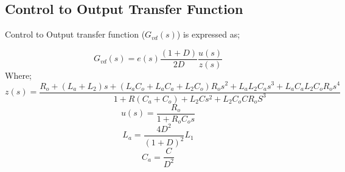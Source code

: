 \documentclass[12pt]{article}
\begin{document}
\begin{figure}[h]
    \qquad
\end{figure}

\pagebreak

\subsection{Control to Output Transfer Function}
Control to Output transfer function ($G_{vd}(s)$) is expressed as;

$$G_{vd}(s) = e(s)\frac{(1+D)}{2D}\frac{u(s)}{z(s)}$$
Where;
$$z(s) = \frac{R_o + (L_a + L_2)s + (L_a C_o + L_a C_a + L_2 C_o)R_o s^2 + L_a L_2 C_a s^3 + L_a C_a L_2 C_o R_o s^4}{1+R(C_a + C_o)+L_2 Cs^2 + L_2 C_o CR_o S^3}$$
$$u(s) = \frac{R_o}{1+R_o C_o s}$$
$$L_a = \frac{4D^2}{(1+D)^2}L_1$$
$$C_a = \frac{C}{D^2}$$
\end{document}
